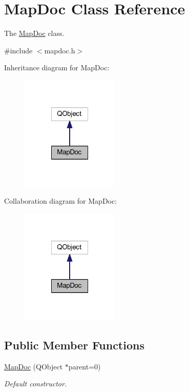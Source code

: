 \hypertarget{class_map_doc}{\section{Map\-Doc Class Reference}
\label{class_map_doc}
}


The \hyperlink{class_map_doc}{Map\-Doc} class.  




{\ttfamily \#include $<$mapdoc.\-h$>$}



Inheritance diagram for Map\-Doc\-:
\nopagebreak
\begin{figure}[H]
\begin{center}
\leavevmode
\includegraphics[width=132pt]{class_map_doc__inherit__graph}
\end{center}
\end{figure}


Collaboration diagram for Map\-Doc\-:
\nopagebreak
\begin{figure}[H]
\begin{center}
\leavevmode
\includegraphics[width=132pt]{class_map_doc__coll__graph}
\end{center}
\end{figure}
\subsection*{Public Member Functions}
\begin{DoxyCompactItemize}
\item 
\hyperlink{class_map_doc_a2bea048c6b43333dc27fb4ca5ed84a95}{Map\-Doc} (Q\-Object $\ast$parent=0)
\begin{DoxyCompactList}\small\item\em Default constructor. \end{DoxyCompactList}\end{DoxyCompactItemize}

